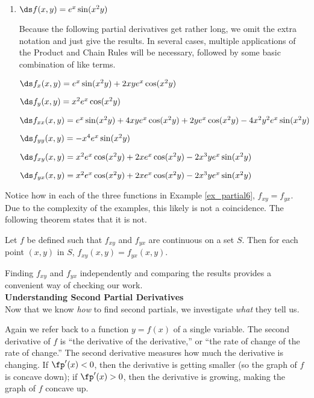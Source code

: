 {\begin{enumerate}
		$\ds f_{yx}(x,y) = \frac{\partial}{\px}\big(f_y\big) = \frac{\partial}{\px}\big(-\frac{2x^3}{y^3}\big) = 
-\frac{6x^2}{y^3}$	

\item	$\ds f(x,y) = e^x\sin(x^2y)$

  Because the following partial derivatives get rather long, we omit the extra notation and just give the results. In several cases, multiple applications of the Product and Chain Rules will be necessary, followed by some basic combination of like terms.

$\ds f_x(x,y) = e^x\sin(x^2y) + 2xye^x\cos(x^2y)$
	
	$\ds f_y(x,y) = x^2e^x\cos(x^2y)$
	
	$\ds f_{xx}(x,y) = e^x\sin(x^2y)+4xye^x\cos(x^2y)+2ye^x\cos(x^2y)-4x^2y^2e^x\sin(x^2y)$ 
	
	
		$\ds f_{yy}(x,y) =  -x^4e^x\sin(x^2y)$
		
		$\ds f_{xy}(x,y) = x^2e^x\cos(x^2y)+2xe^x\cos(x^2y)-2x^3ye^x\sin(x^2y)$
		
		$\ds f_{yx}(x,y) = x^2e^x\cos(x^2y)+2xe^x\cos(x^2y)-2x^3ye^x\sin(x^2y)$
	
\end{enumerate}
\baselineskip
}
\clearpage

Notice how in each of the three functions in Example \ref{ex_partial6}, $f_{xy} = f_{yx}$. Due to the complexity of the examples, this likely is not a coincidence. The following theorem states that it is not.

{Let $f$ be defined such that $f_{xy}$ and $f_{yx}$ are continuous on a set $S$. Then for each point $(x,y)$ in $S$, $f_{xy}(x,y) = f_{yx}(x,y)$.
}

Finding $f_{xy}$ and $f_{yx}$ independently and comparing the results provides a convenient way of checking our work.\\

\noindent\textbf{\large Understanding Second Partial Derivatives}\\

Now that we know \textit{how} to find second partials, we investigate \textit{what} they tell us. 

Again we refer back to a function $y=f(x)$ of a single variable. The second derivative of $f$ is ``the derivative of the derivative,'' or ``the rate of change of the rate of change.'' The second derivative measures how much the derivative is changing. If $\fp'(x)<0$, then the derivative is getting smaller (so the graph of $f$ is concave down); if $\fp'(x)>0$, then the derivative is growing, making the graph of $f$ concave up. 

